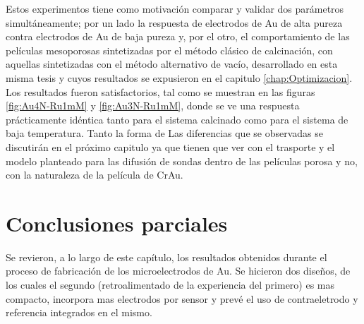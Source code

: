 	    Estos experimentos tiene como motivación comparar y validar dos parámetros simultáneamente; por un lado la respuesta de electrodos de Au de alta pureza contra electrodos de Au de baja pureza y, por el otro, el comportamiento de las películas mesoporosas sintetizadas por el método clásico de calcinación, con aquellas sintetizadas con el método alternativo de vacío, desarrollado en esta misma tesis y cuyos resultados se expusieron en el capitulo \ref{chap:Optimizacion}.
    	Los resultados fueron satisfactorios, tal como se muestran en las figuras \ref{fig:Au4N-Ru1mM} y \ref{fig:Au3N-Ru1mM}, donde se ve una respuesta prácticamente idéntica tanto para el sistema calcinado como para el sistema de baja temperatura. 
    	Tanto la forma de Las diferencias que se observadas se discutirán en el próximo capitulo ya que tienen que ver con el trasporte y el modelo planteado para las difusión de sondas dentro de las películas porosa y no, con la naturaleza de la película de Cr\textbar Au.




\section{Conclusiones parciales}

	Se revieron, a lo largo de este capítulo, los resultados obtenidos durante el proceso de fabricación de los microelectrodos de Au. Se hicieron dos diseños, de los cuales el segundo (retroalimentado de la experiencia del primero) es mas compacto, incorpora mas electrodos por sensor y prevé el uso de contraeletrodo y referencia integrados en el mismo.
	
